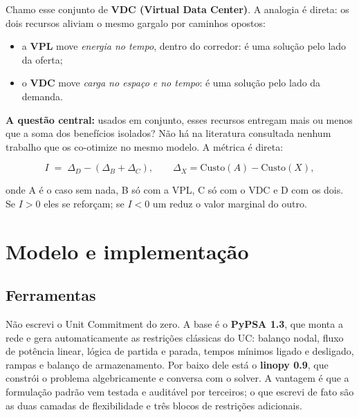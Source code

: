 \documentclass[11pt,a4paper]{article}
\begin{document}
Chamo esse conjunto de \textbf{VDC (Virtual Data Center)}. A analogia é direta: os dois recursos
aliviam o mesmo gargalo por caminhos opostos:

\begin{itemize}
\item a \textbf{VPL} move \emph{energia no tempo}, dentro do corredor: é uma solução pelo lado da oferta;
\item o \textbf{VDC} move \emph{carga no espaço e no tempo}: é uma solução pelo lado da demanda.
\end{itemize}

\textbf{A questão central:} usados em conjunto, esses recursos entregam mais ou menos que a soma dos
benefícios isolados? Não há na literatura consultada nenhum trabalho que os co-otimize no mesmo modelo. A métrica é direta:

\begin{equation}
I \;=\; \Delta_D - (\Delta_B + \Delta_C),
\qquad \Delta_X = \text{Custo}(A) - \text{Custo}(X),
\label{eq:I}
\end{equation}

onde A é o caso sem nada, B só com a VPL, C só com o VDC e D com os dois. Se $I>0$ eles se reforçam;
se $I<0$ um reduz o valor marginal do outro.

\section{Modelo e implementação}

\subsection{Ferramentas}

Não escrevi o Unit Commitment do zero. A base é o \textbf{PyPSA 1.3}, que monta a rede e gera
automaticamente as restrições clássicas do UC: balanço nodal, fluxo de potência linear, lógica de partida
e parada, tempos mínimos ligado e desligado, rampas e balanço de armazenamento. Por baixo dele está o
\textbf{linopy 0.9}, que constrói o problema algebricamente e conversa com o solver. A vantagem é que a
formulação padrão vem testada e auditável por terceiros; o que escrevi de fato são as duas camadas de
flexibilidade e três blocos de restrições adicionais.
\end{document}
